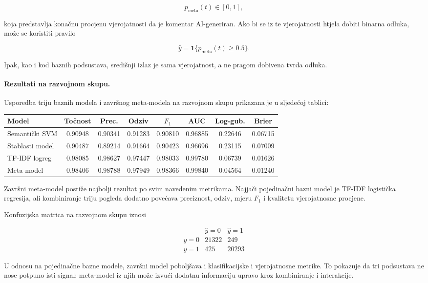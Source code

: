 \documentclass{article}
\begin{document}
\[
p_{\mathrm{meta}}(t)\in[0,1],
\]

koja predstavlja konačnu procjenu vjerojatnosti da je komentar AI-generiran. Ako bi se iz te vjerojatnosti htjela dobiti binarna odluka, može se koristiti pravilo

\[
\hat y = \mathbf{1}\{p_{\mathrm{meta}}(t)\ge 0.5\}.
\]

Ipak, kao i kod baznih podsustava, središnji izlaz je sama vjerojatnost, a ne pragom dobivena tvrda odluka.

\paragraph{Rezultati na razvojnom skupu.}
Usporedba triju baznih modela i završnog meta-modela na razvojnom skupu prikazana je u sljedećoj tablici:

{\small
\setlength{\tabcolsep}{4pt}
\begin{center}
\begin{tabular}{lccccccc}
\hline
Model & Točnost & Prec. & Odziv & $F_1$ & AUC & Log-gub. & Brier \\
\hline
Semantički SVM & 0.90948 & 0.90341 & 0.91283 & 0.90810 & 0.96885 & 0.22646 & 0.06715 \\
Stablasti model & 0.90487 & 0.89214 & 0.91664 & 0.90423 & 0.96696 & 0.23115 & 0.07009 \\
TF-IDF logreg & 0.98085 & 0.98627 & 0.97447 & 0.98033 & 0.99780 & 0.06739 & 0.01626 \\
\hline
Meta-model & 0.98406 & 0.98788 & 0.97949 & 0.98366 & 0.99840 & 0.04564 & 0.01240 \\
\hline
\end{tabular}
\end{center}
}

Završni meta-model postiže najbolji rezultat po svim navedenim metrikama. Najjači pojedinačni bazni model je TF-IDF logistička regresija, ali kombiniranje triju pogleda dodatno povećava preciznost, odziv, mjeru $F_1$ i kvalitetu vjerojatnosne procjene.

Konfuzijska matrica na razvojnom skupu iznosi

\[
\begin{array}{c|cc}
 & \hat y=0 & \hat y=1 \\
\hline
y=0 & 21322 & 249 \\
y=1 & 425 & 20293
\end{array}
\]

U odnosu na pojedinačne bazne modele, završni model poboljšava i klasifikacijske i vjerojatnosne metrike. To pokazuje da tri podsustava ne nose potpuno isti signal: meta-model iz njih može izvući dodatnu informaciju upravo kroz kombiniranje i interakcije.
\end{document}
